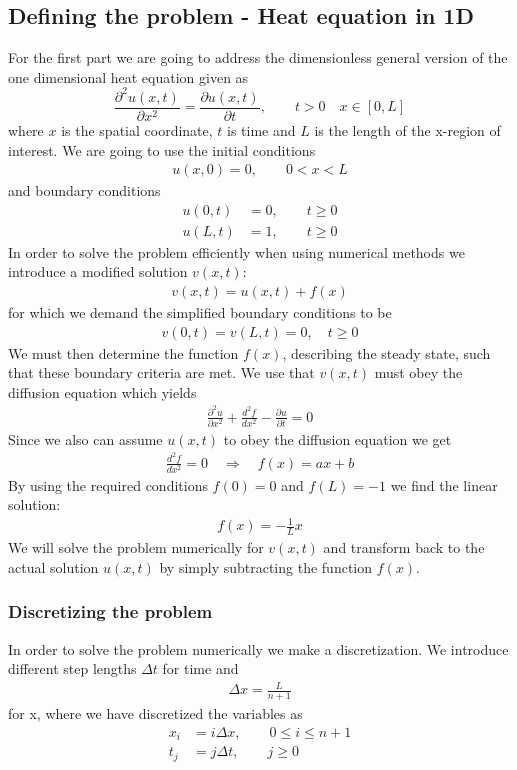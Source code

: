 \documentclass[%
 reprint,
nofootinbib,
aps,
]{revtex4-1}
\begin{document}
\subsection{Defining the problem - Heat equation in 1D} \label{sec:defproblem1D}
For the first part we are going to address the dimensionless general version of the one dimensional heat equation given as
\begin{equation}
    \frac{\partial^2 u(x,t)}{\partial x^2} = \frac{\partial u(x,t)}{\partial t}, \qquad t>0 \quad x \in [0,L]
    \label{eq:num_HQ}
\end{equation}
where $x$ is the spatial coordinate, $t$ is time and $L$ is the length of the x-region of interest. We are going to use the initial conditions
\begin{align*}
    u(x,0) = 0, \qquad 0<x<L
\end{align*}
and boundary conditions
\begin{align*}
    u(0,t) &= 0, \qquad t \ge 0 \\
    u(L,t) &= 1, \qquad t \ge 0
\end{align*}
In order to solve the problem efficiently when using numerical methods we introduce a modified solution $v(x,t)$:
\begin{align*}
    v(x,t) = u(x,t) + f(x)
\end{align*}
for which we demand the simplified boundary conditions to be
\begin{align*}
     v(0,t) = v(L,t) = 0, \quad t\ge0
\end{align*}
We must then determine the function $f(x)$, describing the steady state, such that these boundary criteria are met. We use that $v(x,t)$ must obey the diffusion equation which yields
\begin{align*}
    \frac{\partial^2u}{\partial x^2} + \frac{d^2f}{dx^2} - \frac{\partial u}{\partial t} = 0
\end{align*}
Since we also can assume $u(x,t)$ to obey the diffusion equation we get
\begin{align*}
     \frac{d^2f}{dx^2} = 0 \quad \Longrightarrow \quad  f(x) = ax + b
\end{align*}
By using the required conditions $f(0) = 0$ and $f(L) = -1$ we find the linear solution:
\begin{align*}
    f(x) = -\frac{1}{L}x
\end{align*}
We will solve the problem numerically for $v(x,t)$ and transform back to the actual solution $u(x,t)$ by simply subtracting the function $f(x)$.
\subsubsection{Discretizing the problem}
In order to solve the problem numerically we make a discretization. We introduce different step lengths $\Delta t$ for time and
\begin{align*}
    \Delta x = \frac{L}{n+1}
\end{align*}
for x, where we have discretized the variables as
\begin{align*}
    x_i &= i\Delta x, \qquad 0 \le i \le n+1 \\
    t_j &= j\Delta t, \qquad j \ge 0
\end{align*}
\end{document}
